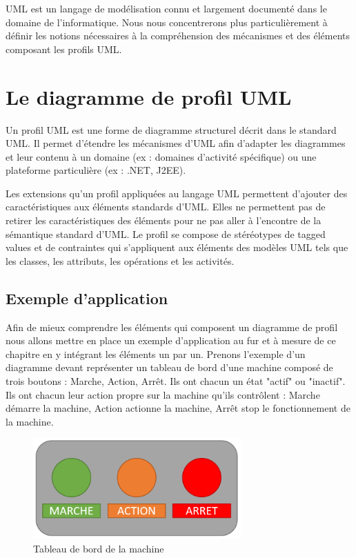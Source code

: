 UML est un langage de modélisation connu et largement documenté dans le domaine de l'informatique.
Nous nous concentrerons plus particulièrement à définir les notions nécessaires à la compréhension des mécanismes et des éléments composant les profils UML.




\section{Le diagramme de profil UML}
Un profil UML est une forme de diagramme structurel décrit dans le standard UML.
Il permet d'étendre les mécanismes d'UML afin d'adapter les diagrammes et leur contenu à un domaine (ex : domaines d'activité spécifique) ou une plateforme particulière (ex : .NET, J2EE).

Les extensions qu'un profil appliquées au langage UML permettent d'ajouter des caractéristiques aux éléments standards d'UML.
Elles ne permettent pas de retirer les caractéristiques des éléments pour ne pas aller à l'encontre de la sémantique standard d'UML.
Le profil se compose  de stéréotypes de tagged values et de contraintes qui s'appliquent aux éléments des modèles UML tels que les classes, les attributs, les opérations et les activités.

\subsection{Exemple d'application}
Afin de mieux comprendre les éléments qui composent un diagramme de profil nous allons mettre en place un exemple d'application au fur et à mesure de ce chapitre en y intégrant les éléments un par un.
Prenons l'exemple d'un diagramme devant représenter un tableau de bord d'une machine composé de trois boutons : Marche, Action, Arrêt.
Ils ont chacun un état "actif" ou "inactif".
Ils ont chacun leur action propre sur la machine qu'ils contrôlent : Marche démarre la machine, Action actionne la machine, Arrêt stop le fonctionnement de la machine.

\begin{figure}[H]
    \centering
    \includegraphics[width=8cm]{10_img/chap4/example.PNG}
    \caption{Tableau de bord de la machine}
    \label{fig.uml_ex}
\end{figure}

